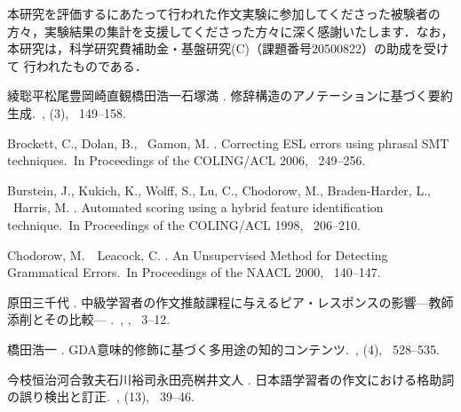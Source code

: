 \documentclass[japanese]{jnlp_1.4}
\begin{document}
\acknowledgment
本研究を評価するにあたって行われた作文実験に参加してくださった被験者の
方々，実験結果の集計を支援してくださった方々に深く感謝いたします．なお，
本研究は，科学研究費補助金・基盤研究(C)（課題番号20500822）の助成を受けて
行われたものである．





\begin{thebibliography}{}

綾聡平\JBA 松尾豊\JBA 岡崎直観\JBA 橋田浩一\JBA 石塚満 \BBCP.
\newblock 修辞構造のアノテーションに基づく要約生成.\
\newblock {}, {}  (3), \mbox{\BPGS\ 149--158}.

Brockett, C., Dolan, B., \BBA\ Gamon, M. \BBCP.
\newblock \BBOQ Correcting ESL errors using phrasal SMT techniques.\BBCQ\
\newblock In {\Bem Proceedings of the COLING/ACL 2006}, \mbox{\BPGS\ 249--256}.

Burstein, J., Kukich, K., Wolff, S., Lu, C., Chodorow, M., Braden-Harder, L.,
  \BBA\ Harris, M. \BBOP 1998\BBCP.
\newblock \BBOQ Automated scoring using a hybrid feature identification
  technique.\BBCQ\
\newblock In {\Bem Proceedings of the COLING/ACL 1998}, \mbox{\BPGS\ 206--210}.

Chodorow, M.\BBACOMMA\ \BBA\ Leacock, C. \BBOP 2000\BBCP.
\newblock \BBOQ An Unsupervised Method for Detecting Grammatical Errors.\BBCQ\
\newblock In {\Bem Proceedings of the NAACL 2000}, \mbox{\BPGS\ 140--147}.

原田三千代 \BBOP 2006\BBCP.
\newblock
  中級学習者の作文推敲課程に与えるピア・レスポンスの影響—教師添削とその比較—
.\
\newblock {}, {}, \mbox{\BPGS\ 3--12}.

橋田浩一 \BBCP.
\newblock GDA意味的修飾に基づく多用途の知的コンテンツ.\
\newblock {}, {}  (4), \mbox{\BPGS\ 528--535}.

今枝恒治\JBA 河合敦夫\JBA 石川裕司\JBA 永田亮\JBA 桝井文人 \BBOP 2003\BBCP.
\newblock 日本語学習者の作文における格助詞の誤り検出と訂正.\
\newblock {}, {}
   (13), \mbox{\BPGS\ 39--46}.


\end{thebibliography}
\end{document}
